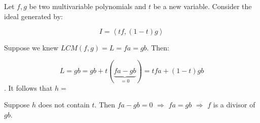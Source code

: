 \begin{frame}
Let \(f, g\) be two multivariable polynomials and $t$ be a new variable. Consider the ideal generated by:

\[
I=\left \langle t f,(1-t) g\right\rangle
\]

Suppose  we knew $ LCM(f,g)=L=fa=gb$.
Then:

\[ 
L= g b = gb + t(\underbrace{f  a -g  b}_{=0}) = tfa + (1-t)gb 
\]
. It follows that $h= $

Suppose $h$ does not contain $t$. Then $fa-gb=0$ $\Rightarrow$ $fa=gb$ $\Rightarrow$ $f$ is a divisor of $gb$.


\end{frame}
